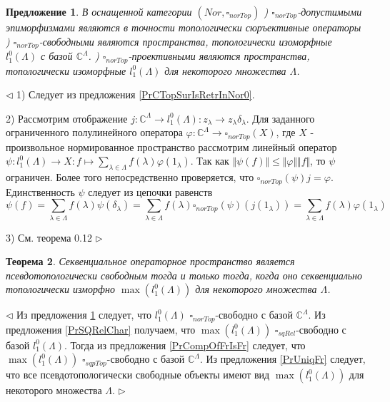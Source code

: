 \documentclass[12pt]{article}
\newtheorem{theorem}{Теорема}[subsection]
\newtheorem{proposition}[theorem]{Предложение}
\newenvironment{proof}{\par $\triangleleft$}{$\triangleright$}
\begin{document}
\begin{proposition}\label{PrNorTopChar}
В оснащенной категории $(Nor, \square_{norTop})$
) $\square_{norTop}$-допустимыми эпиморфизмами являются в точности топологически сюръективные операторы
) $\square_{norTop}$-свободными являются пространства, топологически изоморфные $l_1^0(\Lambda)$ с базой $\mathbb{C}^\Lambda$.
) $\square_{norTop}$-проективными являются пространства, топологически изоморфные $l_1^0(\Lambda)$ для некоторого множества $\Lambda$. 
\end{proposition}
\begin{proof}
1) Следует из предложения \ref{PrCTopSurIsRetrInNor0}.

2) Рассмотрим отображение $j:\mathbb{C}^\Lambda\to l_1^0(\Lambda):z_\lambda\to z_\lambda\delta_\lambda$. Для заданного ограниченного полулинейного оператора $\varphi:\mathbb{C}^\Lambda\to\square_{norTop}(X)$, где $X$ - произвольное нормированное пространство рассмотрим линейный оператор $\psi:l_1^0(\Lambda)\to X:f\mapsto\sum_{\lambda\in\Lambda}f(\lambda)\varphi(1_\lambda)$. Так как $\Vert\psi(f)\Vert\leq\Vert\varphi\Vert\Vert f\Vert$, то $\psi$ ограничен. Более того непосредственно проверяется, что $\square_{norTop}(\psi)j=\varphi$. Единственность $\psi$ следует из цепочки равенств 
$$
\psi(f)=\sum_{\lambda\in\Lambda} f(\lambda)\psi(\delta_\lambda)=\sum_{\lambda\in\Lambda} f(\lambda)\square_{norTop}(\psi)(j(1_\lambda))=\sum_{\lambda\in\Lambda} f(\lambda)\varphi(1_\lambda)
$$

3) См. \cite{GroTopNorPr} теорема 0.12
\end{proof}

\begin{theorem}\label{ThPsTopFrDesc} Секвенциальное операторное пространство является псевдотопологически свободным тогда и только тогда, когда оно секвенциально топологически изморфно $\max(l_1^0(\Lambda))$ для некоторого множества $\Lambda$.
\end{theorem}
\begin{proof}
Из предложения \ref{PrNorTopChar} следует, что $l_1^0(\Lambda)$ $\square_{norTop}$-свободно с базой $\mathbb{C}^\Lambda$. Из предложения \ref{PrSQRelChar} получаем, что $\max(l_1^0(\Lambda))$ $\square_{sqRel}$-свободно с базой 
$l_1^0(\Lambda)$. Тогда из предложения \ref{PrCompOfFrIsFr} следует, что $\max(l_1^0(\Lambda))$ $\square_{sqpTop}$-свободно с базой $\mathbb{C}^\Lambda$. Из предложения \ref{PrUniqFr} следует, что все псевдотопологически 
свободные объекты имеют вид $\max(l_1^0(\Lambda))$ для некоторого множества $\Lambda$.
\end{proof}
\end{document}
